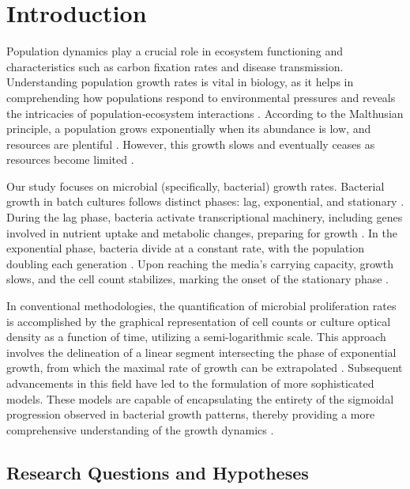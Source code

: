 \documentclass[11pt]{article}
\begin{document}
\section{Introduction}

Population dynamics play a crucial role in ecosystem functioning and characteristics such as carbon fixation rates and disease transmission\cite{Buchanan1997}\cite{Johnson2004}. Understanding population growth rates is vital in biology, as it helps in comprehending how populations respond to environmental pressures and reveals the intricacies of population-ecosystem interactions \cite{Levins1966}. According to the Malthusian principle, a population grows exponentially when its abundance is low, and resources are plentiful \cite{malthus1986essay}. However, this growth slows and eventually ceases as resources become limited \cite{Bolker2013}.

\hfill\break
Our study focuses on microbial (specifically, bacterial) growth rates. Bacterial growth in batch cultures follows distinct phases: lag, exponential, and stationary \cite{baranyi1994dynamic}. During the lag phase, bacteria activate transcriptional machinery, including genes involved in nutrient uptake and metabolic changes, preparing for growth \cite{Buchanan1997}. In the exponential phase, bacteria divide at a constant rate, with the population doubling each generation \cite{Motulsky2004}. Upon reaching the media's carrying capacity, growth slows, and the cell count stabilizes, marking the onset of the stationary phase \cite{Bolker2013}.

\hfill\break
In conventional methodologies, the quantification of microbial proliferation rates is accomplished by the graphical representation of cell counts or culture optical density as a function of time, utilizing a semi-logarithmic scale. This approach involves the delineation of a linear segment intersecting the phase of exponential growth, from which the maximal rate of growth can be extrapolated \cite{baranyi1994dynamic}. Subsequent advancements in this field have led to the formulation of more sophisticated models. These models are capable of encapsulating the entirety of the sigmoidal progression observed in bacterial growth patterns, thereby providing a more comprehensive understanding of the growth dynamics \cite{Motulsky2004}.


\subsection{Research Questions and Hypotheses}
\end{document}
